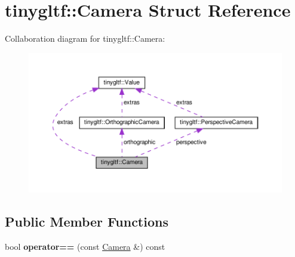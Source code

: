 \hypertarget{structtinygltf_1_1Camera}{}\section{tinygltf\+:\+:Camera Struct Reference}
\label{structtinygltf_1_1Camera}


Collaboration diagram for tinygltf\+:\+:Camera\+:\nopagebreak
\begin{figure}[H]
\begin{center}
\leavevmode
\includegraphics[width=350pt]{structtinygltf_1_1Camera__coll__graph}
\end{center}
\end{figure}
\subsection*{Public Member Functions}
\begin{DoxyCompactItemize}
\item 
\mbox{\label{structtinygltf_1_1Camera_a9177d7462e39003677cb1ac31312dff6}} 
bool {\bfseries operator==} (const \hyperlink{structtinygltf_1_1Camera}{Camera} \&) const
\end{DoxyCompactItemize}
